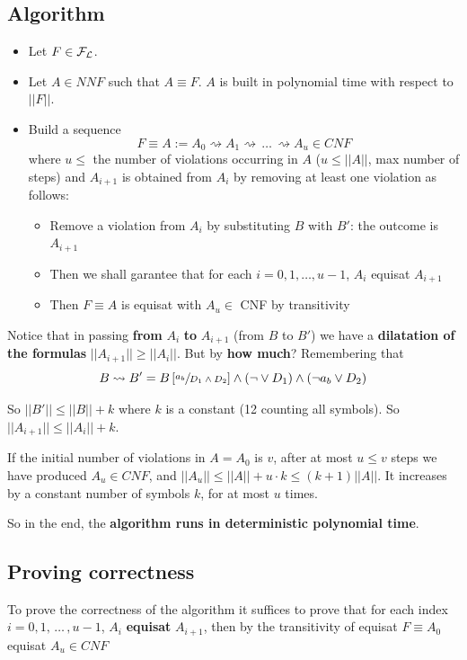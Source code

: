 	\subsection{Algorithm}
	\begin{itemize}
		\item Let $F \in \mathcal{F}_\mathcal{L}$.\\

		\item Let $A \in NNF$ such that $A \equiv F$. $A$ is built in polynomial time with respect to $||F||$.\\

		\item Build a sequence
		$$ F \equiv A := A_0 \rightsquigarrow A_1 \rightsquigarrow\, \dots \, \rightsquigarrow A_u \in CNF $$
		where $u \leq$ the number of violations occurring in $A$ ($u \leq ||A||$, max number of steps) and $A_{i+1}$ is obtained from $A_i$ by removing at least one violation as follows:
		\begin{itemize}
		  \item Remove a violation from $A_i$ by substituting $B$ with $B'$: the outcome is $A_{i+1}$
		  \item Then we shall garantee that for each $i=0,1, \dots , u-1$, $A_i$ equisat $A_{i+1}$
		  \item Then $F \equiv A$ is equisat with $A_u \in $ CNF by transitivity
		\end{itemize}
	\end{itemize}

	\noindent
	Notice that in passing \textbf{from} $A_i$ \textbf{to} $A_{i+1}$ (from $B$ to $B'$) we have a \textbf{dilatation of the formulas} $||A_{i+1}|| \geq ||A_i||$. But by \textbf{how much}? Remembering that
	$$ B \rightsquigarrow B' = B \left[\sfrac{a_b}{D_1 \wedge D_2}\right] \wedge (\neg \vee D_1) \wedge (\neg a_b \vee D_2) $$

	\noindent
	So $||B'|| \leq ||B|| + k$ where $k$ is a constant (12 counting all symbols). So $||A_{i+1}|| \leq ||A_i|| + k$.

	If the initial number of violations in $A=A_0$ is $v$, after at most $u \leq v$ steps we have produced $A_u \in CNF$, and $||A_u|| \leq ||A|| + u \cdot k \leq (k+1) ||A||$.  It increases by a constant number of symbols $k$, for at most $u$ times.

	So in the end, the \textbf{algorithm runs in deterministic polynomial time}.\\

	\subsection{Proving correctness}
	To prove the correctness of the algorithm it suffices to prove that for each index $i = 0,1, \, \dots \, , u-1$, $A_i$ \textbf{equisat} $A_{i+1}$, then by the transitivity of equisat $F \equiv A_0$ equisat $A_u \in CNF$\\

